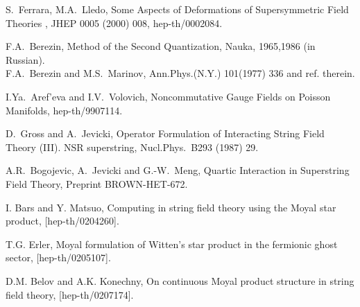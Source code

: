 \documentclass[a4paper,12pt]{article}
\begin{document}
{\begin{thebibliography}{99}
 S.~Ferrara, M.A.~Lledo,
\textsf{Some Aspects of Deformations of Supersymmetric Field
Theories }, JHEP 0005 (2000) 008, hep-th/0002084.

 F.A.~Berezin, \textsf{Method of the Second Quantization},
Nauka, 1965,1986 (in Russian).
\\ F.A.~Berezin and M.S.~Marinov, Ann.Phys.(N.Y.) 101(1977) 336 and ref. therein.

 I.Ya.~Aref'eva and I.V.~Volovich,
\textsf{Noncommutative Gauge Fields on Poisson Manifolds},
hep-th/9907114.

 D.~Gross and A.~Jevicki,
\textsf{Operator Formulation of Interacting String Field Theory
(III). NSR superstring}, Nucl.Phys.~B293 (1987) 29.

 A.R.~Bogojevic, A.~Jevicki and G.-W.~Meng,
\textsf{Quartic Interaction in Superstring Field Theory},
Preprint BROWN-HET-672.

I. Bars and Y. Matsuo,
\textsf{Computing in string field theory using the Moyal star product},
[hep-th/0204260].

T.G. Erler,
\textsf{Moyal formulation of Witten's star product in the fermionic ghost sector},
[hep-th/0205107].

D.M. Belov and A.K. Konechny,
\textsf{On continuous Moyal product structure in string field theory},
[hep-th/0207174].

\end{thebibliography}
}
\end{document}
